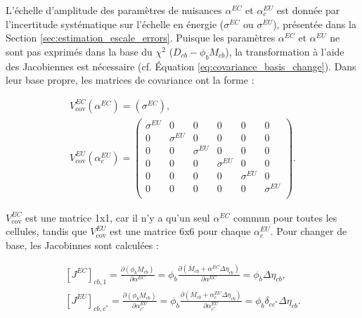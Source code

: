 %

\bigbreak

L'échelle d'amplitude des paramètres de nuisances $\alpha^{EC}$ et $\alpha_c^{EU}$ est donnée par l'incertitude systématique sur l'échelle en énergie ($\sigma^{EC}$ ou $\sigma^{EU}$), présentée dans la Section \ref{sec:estimation_escale_errors}. Puisque les paramètres $\alpha^{EC}$ et $\alpha^{EU}$ ne sont pas exprimés dans la base du $\chi^2$ ($D_{cb} - \phi_bM_{cb}$), la transformation à l'aide des Jacobiennes est nécessaire (cf. Équation \ref{eq:covariance_basis_change}). Dans leur base propre, les matrices de covariance ont la forme :

\begin{equation}
\begin{gathered}
    V_\textrm{cov}^{EC}\left(\alpha^{EC}\right) = (\sigma^{EC}),\\
    V_\textrm{cov}^{EU}\left(\alpha^{EU}_c\right) = \left(\begin{matrix}
        \sigma^{EU} & 0 & 0 & 0 & 0 & 0 \\
        0 & \sigma^{EU} & 0 & 0 & 0 & 0 \\
        0 & 0 & \sigma^{EU} & 0 & 0 & 0 \\
        0 & 0 & 0 & \sigma^{EU} & 0 & 0 \\
        0 & 0 & 0 & 0 & \sigma^{EU} & 0 \\
        0 & 0 & 0 & 0 & 0 & \sigma^{EU} \\
    \end{matrix} \right).
\end{gathered}
\end{equation}

\bigbreak

$V_\textrm{cov}^{EC}$ est une matrice 1x1, car il n'y a qu'un seul $\alpha^{EC}$ commun pour toutes les cellules, tandis que $V_\textrm{cov}^{EU}$ est une matrice 6x6 pour chaque $\alpha^{EU}_c$. Pour changer de base, les Jacobinnes sont calculées :

\begin{equation}
\begin{gathered}
    \left[J^{EC}\right]_{cb,1} = \frac{\partial \left(\phi_bM_{cb}\right)}{\partial \alpha^{EC}} = \phi_b \frac{\partial \left(\overline{M}_{cb} + \alpha^{EC} \Delta \eta_{cb}\right)}{\partial \alpha^{EC}} = \phi_b \Delta \eta_{cb},\\
    \left[J^{EU}\right]_{cb,c^*} = \frac{\partial \left(\phi_bM_{cb}\right)}{\partial \alpha^{EU}_{c^*}} = \phi_b \frac{\partial \left(\overline{M}_{cb} + \alpha^{EU}_c \Delta \eta_{cb}\right)}{\partial \alpha^{EU}_{c^*}} = \phi_b \delta_{cc^*} \Delta \eta_{cb}.
\end{gathered}
\end{equation}

